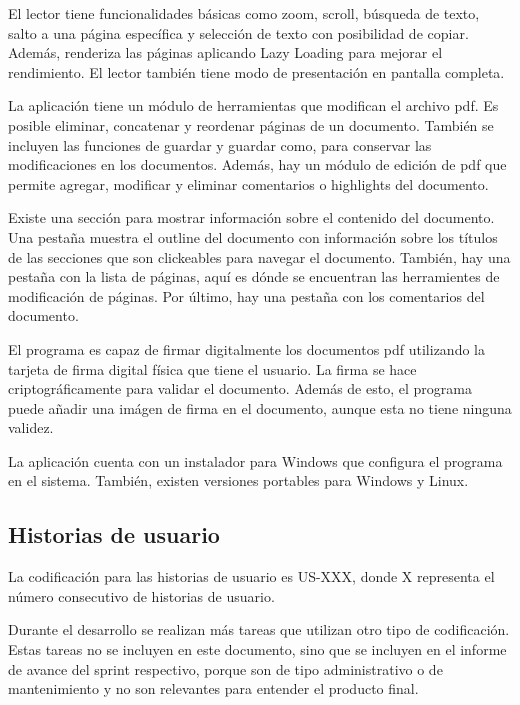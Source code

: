 El lector tiene funcionalidades básicas como zoom, scroll, búsqueda de texto, salto a una página específica y selección de texto con posibilidad de copiar. Además, renderiza las páginas aplicando Lazy Loading para mejorar el rendimiento. El lector también tiene modo de presentación en pantalla completa.

La aplicación tiene un módulo de herramientas que modifican el archivo pdf. Es posible eliminar, concatenar y reordenar páginas de un documento. También se incluyen las funciones de guardar y guardar como, para conservar las modificaciones en los documentos. Además, hay un módulo de edición de pdf que permite agregar, modificar y eliminar comentarios o highlights del documento.

Existe una sección para mostrar información sobre el contenido del documento. Una pestaña muestra el outline del documento con información sobre los títulos de las secciones que son clickeables para navegar el documento. También, hay una pestaña con la lista de páginas, aquí es dónde se encuentran las herramientes de modificación de páginas. Por último, hay una pestaña con los comentarios del documento.

El programa es capaz de firmar digitalmente los documentos pdf utilizando la tarjeta de firma digital física que tiene el usuario. La firma se hace criptográficamente para validar el documento. Además de esto, el programa puede añadir una imágen de firma en el documento, aunque esta no tiene ninguna validez.

La aplicación cuenta con un instalador para Windows que configura el programa en el sistema. También, existen versiones portables para Windows y Linux.


\subsection{Historias de usuario}

La codificación para las historias de usuario es US-XXX, donde X representa el número consecutivo de historias de usuario.

Durante el desarrollo se realizan más tareas que utilizan otro tipo de codificación. Estas tareas no se incluyen en este documento, sino que se incluyen en el informe de avance del sprint respectivo, porque son de tipo  administrativo o de mantenimiento y no son relevantes para entender el producto final.



